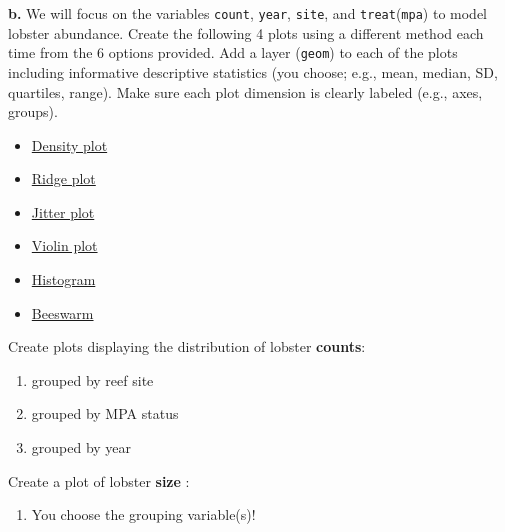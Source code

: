 \documentclass[
]{article}
\providecommand{\tightlist}{%
  \setlength{\itemsep}{0pt}\setlength{\parskip}{0pt}}
\begin{document}
\textbf{b.} We will focus on the variables \texttt{count},
\texttt{year}, \texttt{site}, and \texttt{treat}(\texttt{mpa}) to model
lobster abundance. Create the following 4 plots using a different method
each time from the 6 options provided. Add a layer (\texttt{geom}) to
each of the plots including informative descriptive statistics (you
choose; e.g., mean, median, SD, quartiles, range). Make sure each plot
dimension is clearly labeled (e.g., axes, groups).

\begin{itemize}
\tightlist
\item
  \href{https://r-charts.com/distribution/density-plot-group-ggplot2}{Density
  plot}
\item
  \href{https://r-charts.com/distribution/ggridges/}{Ridge plot}
\item
  \href{https://ggplot2.tidyverse.org/reference/geom_jitter.html}{Jitter
  plot}
\item
  \href{https://r-charts.com/distribution/violin-plot-group-ggplot2}{Violin
  plot}
\item
  \href{https://r-charts.com/distribution/histogram-density-ggplot2/}{Histogram}
\item
  \href{https://r-charts.com/distribution/beeswarm/}{Beeswarm}
\end{itemize}

Create plots displaying the distribution of lobster \textbf{counts}:

\begin{enumerate}
\def\labelenumi{\arabic{enumi})}
\tightlist
\item
  grouped by reef site\\
\item
  grouped by MPA status
\item
  grouped by year
\end{enumerate}

Create a plot of lobster \textbf{size} :

\begin{enumerate}
\def\labelenumi{\arabic{enumi})}
\setcounter{enumi}{3}
\tightlist
\item
  You choose the grouping variable(s)!
\end{enumerate}
\end{document}
